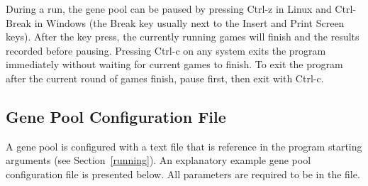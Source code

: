 \documentclass[letterpaper]{article}
\renewcommand{\_}{\allowbreak\textunderscore\allowbreak}
\begin{document}
During a run, the gene pool can be paused by pressing Ctrl-z in Linux and Ctrl-Break in Windows (the Break key usually next to the Insert and Print Screen keys). After the key press, the currently running games will finish and the results recorded before pausing. Pressing Ctrl-c on any system exits the program immediately without waiting for current games to finish. To exit the program after the current round of games finish, pause first, then exit with Ctrl-c.

\subsection{Gene Pool Configuration File}
A gene pool is configured with a text file that is reference in the program starting arguments (see Section~\ref{running}). An explanatory example gene pool configuration file is presented below. All parameters are required to be in the file.

\end{document}
